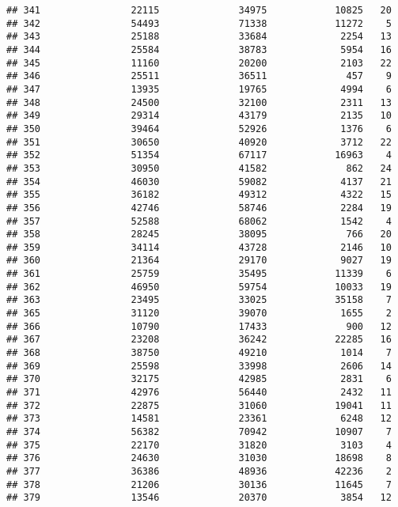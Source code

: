 \documentclass[
]{article}
\begin{document}
\begin{verbatim}
## 341                22115              34975            10825   20
## 342                54493              71338            11272    5
## 343                25188              33684             2254   13
## 344                25584              38783             5954   16
## 345                11160              20200             2103   22
## 346                25511              36511              457    9
## 347                13935              19765             4994    6
## 348                24500              32100             2311   13
## 349                29314              43179             2135   10
## 350                39464              52926             1376    6
## 351                30650              40920             3712   22
## 352                51354              67117            16963    4
## 353                30950              41582              862   24
## 354                46030              59082             4137   21
## 355                36182              49312             4322   15
## 356                42746              58746             2284   19
## 357                52588              68062             1542    4
## 358                28245              38095              766   20
## 359                34114              43728             2146   10
## 360                21364              29170             9027   19
## 361                25759              35495            11339    6
## 362                46950              59754            10033   19
## 363                23495              33025            35158    7
## 365                31120              39070             1655    2
## 366                10790              17433              900   12
## 367                23208              36242            22285   16
## 368                38750              49210             1014    7
## 369                25598              33998             2606   14
## 370                32175              42985             2831    6
## 371                42976              56440             2432   11
## 372                22875              31060            19041   11
## 373                14581              23361             6248   12
## 374                56382              70942            10907    7
## 375                22170              31820             3103    4
## 376                24630              31030            18698    8
## 377                36386              48936            42236    2
## 378                21206              30136            11645    7
## 379                13546              20370             3854   12

\end{verbatim}
\end{document}
